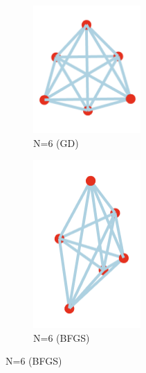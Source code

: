\documentclass[11pt,onecolumn]{article}
\begin{document}
\begin{figure}[h]
  \begin{subfigure}[b]{0.45\textwidth}
    \centering
    \includegraphics[width=0.45\textwidth]{N6_1.png}
    \caption{N=6 (GD)}
    \label{fig:sub3}
  \end{subfigure}
  \hfill
  \begin{subfigure}[b]{0.45\textwidth}
    \centering
    \includegraphics[width=0.45\textwidth]{N6_2.png}
    \caption{N=6 (BFGS)}
    \label{fig:sub4}
  \end{subfigure}

  \vspace{1em}


\end{figure}
\end{document}
